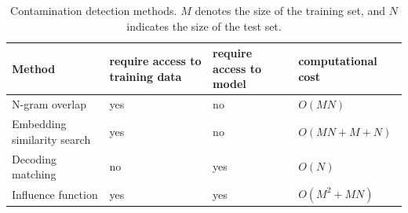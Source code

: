 \begin{table}
\centering
\caption{Contamination detection methods. \( M \) denotes the size of the training set, and \( N \) indicates the size of the test set.}
\label{table:detection-algorithms}
\begin{tabular}{llll}
\toprule
Method                      &  require access to training data & require access to model & computational cost \\
\midrule
N-gram overlap              & yes                     & no              & \(O(MN)\)        \\
Embedding similarity search & yes                     & no              & \(O(MN+M+N)\)  \\
Decoding matching           & no                      & yes             & \(O(N)\)         \\
Influence function          & yes                     & yes             & \(O(M^2+MN)\)      \\
\bottomrule
\end{tabular}
\end{table}









